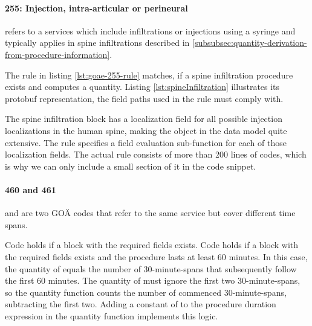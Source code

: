 \paragraph{255: Injection, intra-articular or perineural}
 refers to a services which include infiltrations or injections using a syringe and typically applies in spine infiltrations described in \ref{subsubsec:quantity-derivation-from-procedure-information}.

The rule in listing \ref{lst:goae-255-rule} matches, if a spine infiltration procedure exists and computes a quantity.
Listing \ref{lst:spineInfiltration} illustrates its protobuf representation, the field paths used in the rule must comply with.


The spine infiltration block has a localization field for all possible injection localizations in the human spine,
making the object in the data model quite extensive.
The rule specifies a field evaluation sub-function for each of those localization fields.
The actual rule consists of more than 200 lines of codes,
which is why we can only include a small section of it in the code snippet.

\paragraph{460 and 461}
and  are two GOÄ codes that refer to the same service but cover different time spans.



Code  holds if a  block with the required fields exists.
Code  holds if a  block with the required fields exists and the procedure lasts at least 60 minutes.
In this case, the quantity of  equals the number of 30-minute-spans that subsequently follow the first 60 minutes.
The quantity of  must ignore the first two 30-minute-spans, so the quantity function counts the number of commenced 30-minute-spans, subtracting the first two.
Adding a constant of  to the procedure duration expression in the quantity function implements this logic.

